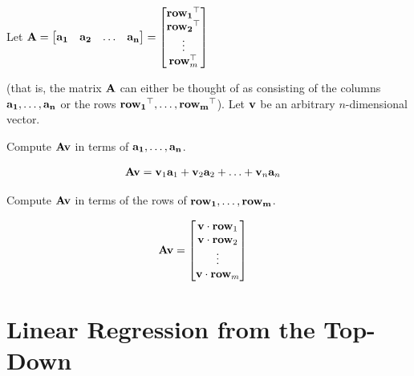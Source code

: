 \documentclass[assignment01_Solutions]{subfiles}
\begin{document}
\begin{exercise}[(20 minutes)]
\item Let $\mathbf{A} = \begin{bmatrix} \mathbf{a_1} & \mathbf{a_2} & \ldots & \mathbf{a_n} \end{bmatrix} = \begin{bmatrix} \mathbf{row_1}^\top \\ \mathbf{row_2}^\top \\ \vdots \\ \mathbf{row}_m^\top \end{bmatrix}$

(that is, the matrix $\mathbf{A}$ can either be thought of as consisting of the columns $\mathbf{a_1}, \ldots, \mathbf{a_n}$ or the rows $\mathbf{row_1}^\top, \ldots, \mathbf{row_m}^\top$).  Let $\mathbf{v}$ be an arbitrary $n$-dimensional vector.

Compute $\mathbf{A}\mathbf{v}$ in terms of $\mathbf{a_1}, \ldots, \mathbf{a_n}$.

\begin{boxedsolution}
\begin{align}
\mathbf{A} \mathbf{v} &= \mathbf{v}_1 \mathbf{a}_1 + \mathbf{v}_2 \mathbf{a}_2 + \ldots + \mathbf{v}_n \mathbf{a}_n
\end{align}
\end{boxedsolution}

Compute $\mathbf{A} \mathbf{v}$ in terms of the rows of $\mathbf{row_1}, \ldots, \mathbf{row_m}$.

\begin{boxedsolution}
\begin{align}
\mathbf{A} \mathbf{v} &= \begin{bmatrix} \mathbf{v} \cdot \mathbf{row}_1 \\   \mathbf{v} \cdot \mathbf{row}_2 \\ \vdots \\ \mathbf{v} \cdot \mathbf{row}_m \end{bmatrix}
\end{align}
\end{boxedsolution}

\ees
\end{exercise}

\section{Linear Regression from the Top-Down}
\end{document}
